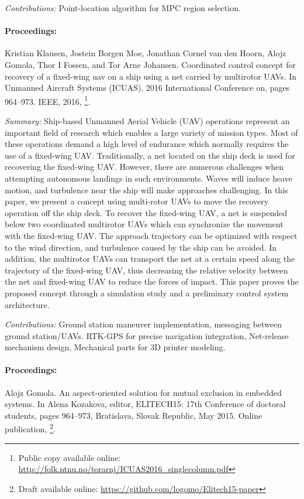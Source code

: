 \emph{Contributions:} Point-location algorithm for MPC region selection. 

\paragraph{Proceedings:} Kristian Klausen, Jostein Borgen Moe, Jonathan Cornel van den Hoorn, Alojz Gomola, Thor I Fossen, and Tor Arne Johansen. Coordinated control concept for recovery of a fixed-wing uav on a ship using a net carried by multirotor UAVs.  In Unmanned Aircraft Systems (ICUAS), 2016 International Conference on, pages 964–973. IEEE, 2016, \cite{klausen2016coordinated}\footnote{Public copy available online: \url{http://folk.ntnu.no/torarnj/ICUAS2016_singlecolumn.pdf}}.

\emph{Summary:} Ship-based Unmanned Aerial Vehicle (UAV) operations represent an important field of research which enables a large variety of mission types. Most of these operations demand a high level of endurance which normally requires the use of a fixed-wing UAV. Traditionally, a net located on the ship deck is used for recovering the fixed-wing UAV. However, there are numerous challenges when attempting autonomous landings in such environments. Waves will induce heave motion, and turbulence near the ship will make approaches challenging. In this paper, we present a concept using multi-rotor UAVs to move the recovery operation off the ship deck. To recover the fixed-wing UAV, a net is suspended below two coordinated multirotor UAVs which can synchronize the movement with the fixed-wing UAV. The approach trajectory can be optimized with respect to the wind direction, and turbulence caused by the ship can be avoided. In addition, the multirotor UAVs can transport the net at a certain speed along the trajectory of the fixed-wing UAV, thus decreasing the relative velocity between the net and fixed-wing UAV to reduce the forces of impact. This paper proves the proposed concept through a simulation study and a preliminary control system architecture.

\emph{Contributions:} Ground station maneuver implementation, messaging between ground station/UAVs. RTK-GPS for precise navigation integration, Net-release mechanism design, Mechanical parts for 3D printer modeling. 

\paragraph{Proceedings:}  Alojz Gomola.  An aspect-oriented solution for mutual exclusion in embedded systems. In Alena Kozakova, editor, ELITECH15: 17th Conference of doctoral students, pages 964–973, Bratislava, Slovak Republic, May 2015. Online publication, \cite{gomola2015aspectOriented}\footnote{Draft available online: \url{https://github.com/logomo/Elitech15-paper}}.

